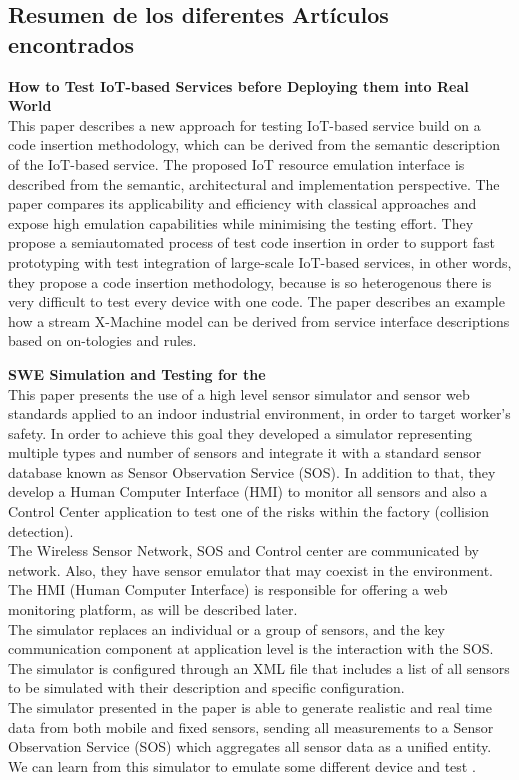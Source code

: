 
\subsection{Resumen de los diferentes Artículos encontrados}

\textbf{How to Test IoT-based Services before Deploying them into Real World}\cite{Paper2}\\
This paper describes  a  new  approach  for  testing  IoT-based  service  build on  a  code  insertion  methodology,  which  can  be  derived  from the semantic description of the IoT-based service.
The proposed IoT resource emulation interface is described from the semantic, architectural  and  implementation  perspective.  The  paper  compares its applicability and efficiency with classical approaches and expose  high  emulation  capabilities  while  minimising  the  testing effort.
They propose a semiautomated process of test code insertion in order to support fast prototyping with test integration of large-scale IoT-based services, in other words, they propose a code insertion methodology, because \IoT is so heterogenous there is very difficult to test every device with one code.
The paper describes an example how a stream X-Machine model can be derived from service interface descriptions based on on-tologies and rules.

\textbf{SWE Simulation and Testing for the \IoT}\cite{Paper3}\\
This paper presents the use of a high level sensor simulator and sensor web standards applied to an indoor industrial environment, in order to target worker's safety. In order to achieve this goal they developed a simulator representing multiple types and number of sensors and integrate it with a standard sensor database known as Sensor Observation Service (SOS). In addition to that, they develop a Human Computer Interface (HMI) to monitor all sensors and also a Control Center application to test one of the risks within the factory (collision detection).\\
The Wireless Sensor Network, SOS and Control center are communicated by network. Also, they have sensor emulator that may coexist in the environment. The HMI (Human Computer Interface) is responsible for offering a web monitoring platform, as will be described later.\\
The simulator replaces an individual or a group of sensors, and the key communication component at application level is the interaction with the SOS. \\
The simulator is configured through an XML file that includes a list of all sensors to be simulated with their description and specific configuration.\\
The simulator presented in the paper is able to generate realistic and real time data from both mobile and fixed sensors, sending all measurements to a Sensor Observation Service (SOS) which aggregates all sensor data as a unified entity. \\
We can learn from this simulator to emulate some different device and test \IoT.\\

